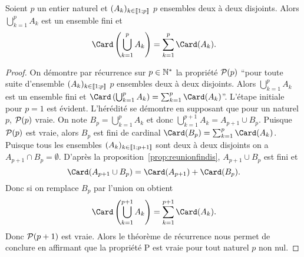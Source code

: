 \begin{prop}
  Soient $p$ un entier naturel et $(A_k)_{k\in\intervalleentier{1}{p}}$ $p$ ensembles deux à deux disjoints. Alors $\bigcup_{k=1}^{p}A_k$ est un ensemble fini et
  \begin{equation}
    \Card\left(\bigcup_{k=1}^{p}A_k\right)=\sum_{k=1}^{p}\Card(A_k).
  \end{equation}
\end{prop}
\begin{proof}
  On démontre par récurrence sur $p\in \N^*$ la propriété $\P(p)$ ``pour toute suite d'ensemble $(A_k)_{k\in\intervalleentier{1}{p}}$ $p$ ensembles deux à deux disjoints. Alors $\bigcup_{k=1}^{p}A_k$ est un ensemble fini et $\Card\left(\bigcup_{k=1}^{p}A_k\right)=\sum_{k=1}^{p}\Card(A_k)$''. L'étape initiale pour $p=1$ est évident. L'hérédité se démontre en supposant que pour un naturel $p$, $\P(p)$ vraie. On note $B_p=\bigcup_{k=1}^{p}A_k$ et donc $\bigcup_{k=1}^{p+1}A_k=A_{p+1}\cup B_p$. Puisque $\P(p)$ est vraie, alors $B_p$ est fini de cardinal $\Card(B_p)=\sum_{k=1}^{p}\Card(A_k)$. Puisque tous les ensembles $(A_k)_{k\in\intervalleentier{1}{p+1}}$ sont deux à deux disjoints on a $A_{p+1}\cap B_p=\emptyset$. D'après la proposition~\ref{prop:reunionfindis}, $A_{p+1}\cup B_p$ est fini et
\begin{equation}
  \Card(A_{p+1}\cup B_p) = \Card(A_{p+1})+\Card(B_p).
\end{equation}
Donc si on remplace $B_p$ par l'union on obtient
\begin{equation}
  \Card\left(\bigcup_{k=1}^{p+1}A_k\right) = \sum_{k=1}^{p+1}\Card(A_k).
\end{equation}
Donc $\P(p+1)$ est vraie. Alors le théorème de récurrence nous permet de conclure en affirmant que la propriété P est vraie pour tout naturel $p$ non nul.
\end{proof}

